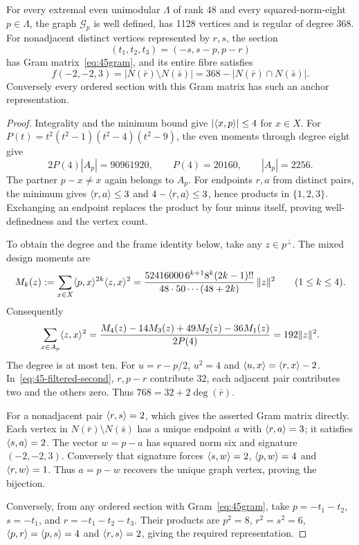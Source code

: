 \begin{proposition}\label{prop:45-anchor-graph}
For every extremal even unimodular $\Lambda$ of rank 48 and every
squared-norm-eight $p\in\Lambda$, the graph $\mathcal G_p$ is well
defined, has 1128 vertices and is regular of degree 368.
For nonadjacent distinct vertices represented by $r,s$, the section
\[
(t_1,t_2,t_3)=(-s,s-p,p-r)
\]
has Gram matrix~\eqref{eq:45gram}, and its entire fibre satisfies
\begin{equation}\label{eq:45-fibre-graph}
f(-2,-2,3)=|N(\bar r)\setminus N(\bar s)|
         =368-|N(\bar r)\cap N(\bar s)|.
\end{equation}
Conversely every ordered section with this Gram matrix has such an
anchor representation.
\end{proposition}
\begin{proof}
Integrality and the minimum bound give $|\langle x,p\rangle|\le4$ for
$x\in X$. For $P(t)=t^2(t^2-1)(t^2-4)(t^2-9)$, the even moments
through degree eight give
\[
2P(4)|A_p|=90961920,\qquad P(4)=20160,\qquad |A_p|=2256.
\]
The partner $p-x\ne x$ again belongs to $A_p$. For endpoints $r,a$
from distinct pairs, the minimum gives
$\langle r,a\rangle\le3$ and $4-\langle r,a\rangle\le3$, hence products in
$\{1,2,3\}$. Exchanging an endpoint replaces the product by four
minus itself, proving well-definedness and the vertex count.

To obtain the degree and the frame identity below, take any
$z\in p^\perp$. The mixed design moments are
\[
M_k(z):=\sum_{x\in X}\langle p,x\rangle^{2k}\langle z,x\rangle^2
=\frac{52416000\,6^{k+1}8^k(2k-1)!!}
       {48\cdot50\cdots(48+2k)}\,\|z\|^2\qquad(1\le k\le4).
\]
Consequently
\begin{equation}\label{eq:45-filtered-second}
\sum_{x\in A_p}\langle z,x\rangle^2
=\frac{M_4(z)-14M_3(z)+49M_2(z)-36M_1(z)}{2P(4)}
=192\|z\|^2.
\end{equation}
The degree is at most ten. For $u=r-p/2$, $u^2=4$ and
$\langle u,x\rangle=\langle r,x\rangle-2$. In~\eqref{eq:45-filtered-second},
$r,p-r$ contribute $32$, each adjacent pair contributes two and
the others zero. Thus $768=32+2\deg(\bar r)$.

For a nonadjacent pair $\langle r,s\rangle=2$, which gives the asserted Gram
matrix directly. Each vertex in $N(\bar r)\setminus N(\bar s)$
has a unique endpoint $a$ with $\langle r,a\rangle=3$; it satisfies
$\langle s,a\rangle=2$. The vector $w=p-a$ has squared norm six and
signature $(-2,-2,3)$. Conversely that signature forces
$\langle s,w\rangle=2$, $\langle p,w\rangle=4$ and $\langle r,w\rangle=1$.
Thus $a=p-w$ recovers the unique graph vertex, proving the bijection.

Conversely, from any ordered section with Gram~\eqref{eq:45gram}, take
$p=-t_1-t_2$, $s=-t_1$, and $r=-t_1-t_2-t_3$.
Their products are $p^2=8$, $r^2=s^2=6$,
$\langle p,r\rangle=\langle p,s\rangle=4$ and $\langle r,s\rangle=2$, giving the
required representation.
\end{proof}

